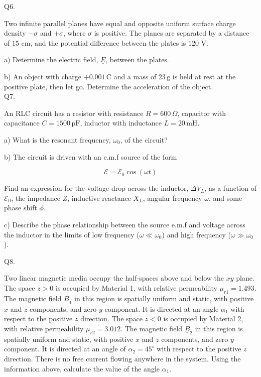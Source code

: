\documentclass[a4paper,11pt]{article}
\begin{document}
Q6. 

Two infinite parallel planes have equal and opposite uniform surface charge density \( -\sigma \) and \( +\sigma \), where \( \sigma \) is positive. The planes are separated by a distance of \( 15 \) cm, and the potential difference between the plates is \( 120 \) V.  

\medskip

a) Determine the electric field, \( \underline{E} \), between the plates.

\medskip

b) An object with charge \( +0.001 \, \text{C} \) and a mass of \( 23 \, \text{g} \) is held at rest at the positive plate, then let go. Determine the acceleration of the object. \\

Q7. 

An RLC circuit has a resistor with resistance \( R = 600 \, \Omega \), capacitor with capacitance \( C = 1500 \, \text{pF} \), inductor with inductance \( L = 20 \, \text{mH} \).

\medskip

a) What is the resonant frequency, \( \omega_{0} \), of the circuit?

\medskip

b) The circuit is driven with an e.m.f source of the form 

\[ \mathcal{E} = \mathcal{E}_{0} \cos(\omega t) \]

Find an expression for the voltage drop across the inductor, \( \Delta V_{L} \), as a function of \( \mathcal{E}_{0} \), the impedance \( Z \), inductive reactance \( X_{L} \), angular frequency \( \omega \), and some phase shift \( \phi \).

\medskip

c) Describe the phase relationship between the source e.m.f and voltage across the inductor in the limits of low frequency (\( \omega \ll \omega_{0} \)) and high frequency (\( \omega \gg \omega_{0} \)).

\bigskip

Q8. 

Two linear magnetic media occupy the half-spaces above and below the \( xy \) plane. The space \( z > 0 \) is occupied by Material 1, with relative permeability \( \mu_{r1} = 1.493 \). The magnetic field \( \underline{B}_{1} \) in this region is spatially uniform and static, with positive \( x \) and \( z \) components, and zero \( y \) component. It is directed at an angle \( \alpha_{1} \) with respect to the positive \( z \) direction. The space \( z < 0 \) is occupied by Material 2, with relative permeability \( \mu_{r2}= 3.012 \). The magnetic field \( \underline{B}_{2} \) in this region is spatially uniform and static, with positive \( x \) and \( z \) components, and zero \( y \) component. It is directed at an angle of \( \alpha_{2} = 45^\circ \) with respect to the positive \( z \) direction. There is no free current flowing anywhere in the system. Using the information above, calculate the value of the angle \( \alpha_{1} \). 
\end{document}
